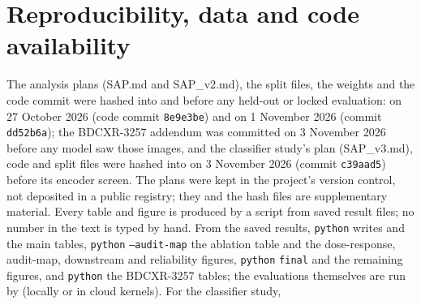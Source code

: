 \section{Reproducibility, data and code availability}
\label{sec:repro}
The analysis plans (SAP.md and SAP\_v2.md), the split files, the weights and the code commit were hashed into  and
 before any held-out or locked evaluation:  on 27 October 2026 (code commit \texttt{8e9e3be}) and
 on 1 November 2026 (commit \texttt{dd52b6a}); the BDCXR-3257 addendum was committed on 3 November 2026 before any model
saw those images, and the classifier study's plan (SAP\_v3.md), code and split files were hashed into  on 3 November
2026 (commit \texttt{c39aad5}) before its encoder screen. The plans were kept in the project's version control, not deposited in a public registry; they and the hash files are
supplementary material. Every table and figure is produced by a script from saved result files; no number in the text is typed by hand. From the saved
results, \texttt{python}  writes  and the main tables, \texttt{python}  \texttt{--audit-map} the ablation table and the dose-response, audit-map, downstream and reliability figures, \texttt{python}  \texttt{final}
and  the remaining figures, and \texttt{python}  the BDCXR-3257 tables; the
evaluations themselves are run by  (locally or in cloud kernels). For the classifier study,

